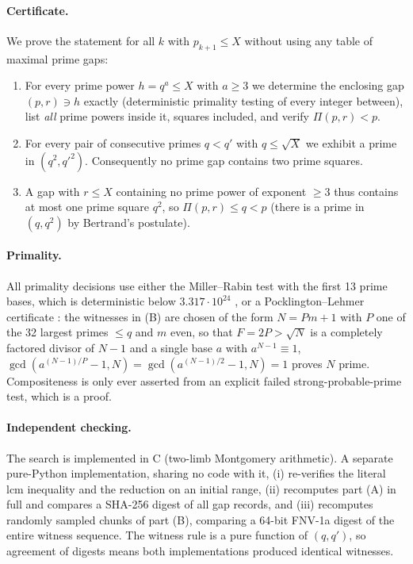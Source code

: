\documentclass[11pt]{amsart}
\begin{document}
\paragraph{Certificate.} We prove the statement for all $k$ with
$p_{k+1}\le X$ without using any table of maximal prime gaps:
\begin{enumerate}
\item[(A)] For every prime power $h=q^a\le X$ with $a\ge 3$ we determine the
enclosing gap $(p,r)\ni h$ exactly (deterministic primality testing of
every integer between), list \emph{all} prime powers inside it, squares
included, and verify $\Pi(p,r)<p$.
\item[(B)] For every pair of consecutive primes $q<q'$ with $q\le\sqrt{X}$ we
exhibit a prime in $(q^2,q'^2)$. Consequently no prime gap contains two
prime squares.
\item[(C)] A gap with $r\le X$ containing no prime power of exponent $\ge3$
thus contains at most one prime square $q^2$, so $\Pi(p,r)\le q<p$ (there
is a prime in $(q,q^2)$ by Bertrand's postulate).
\end{enumerate}

\paragraph{Primality.} All primality decisions use either the Miller--Rabin
test with the first 13 prime bases, which is deterministic below
$3.317\cdot10^{24}$ \cite{SorensonWebster2017}, or a Pocklington--Lehmer
certificate \cite{Pocklington1914,BLS75}: the witnesses in (B) are chosen of
the form $N=Pm+1$ with $P$ one of the 32 largest primes $\le q$ and $m$ even,
so that $F=2P>\sqrt N$ is a completely factored divisor of $N-1$ and a single
base $a$ with $a^{N-1}\equiv1$, $\gcd(a^{(N-1)/P}-1,N)=\gcd(a^{(N-1)/2}-1,N)=1$
proves $N$ prime. Compositeness is only ever asserted from an explicit failed
strong-probable-prime test, which is a proof.

\paragraph{Independent checking.} The search is implemented in C (two-limb
Montgomery arithmetic). A separate pure-Python implementation, sharing no
code with it, (i) re-verifies the literal lcm inequality and the reduction on
an initial range, (ii) recomputes part (A) in full and compares a SHA-256
digest of all gap records, and (iii) recomputes randomly sampled chunks of
part (B), comparing a 64-bit FNV-1a digest of the entire witness sequence.
The witness rule is a pure function of $(q,q')$, so agreement of digests means
both implementations produced identical witnesses.
\end{document}

